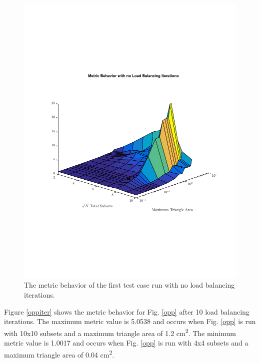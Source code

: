 \documentclass{anstrans}
\begin{document}
\begin{figure}
\centering
\includegraphics[scale=0.5, trim = 0cm 5cm 0cm 5cm,clip]{figures/OppNoIter.pdf}
\caption{The metric behavior of the first test case run with no load balancing iterations.}
\label{oppnoiter}
\end{figure}

Figure \ref{oppiter} shows the metric behavior for Fig. \ref{opp} after 10 load balancing iterations. The maximum metric value is 5.0538 and occurs when Fig. \ref{opp} is run with 10x10 subsets and a maximum triangle area of 1.2 cm\textsuperscript{2}. The minimum metric value is 1.0017 and occurs when Fig. \ref{opp} is run with 4x4 subsets and a maximum triangle area of 0.04 cm\textsuperscript{2}.
\end{document}

